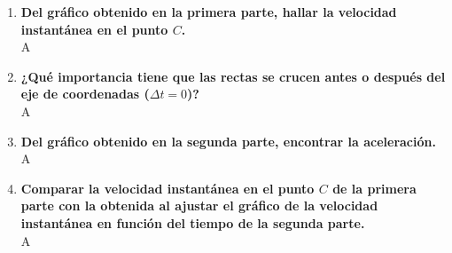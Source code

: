 \documentclass[../main]{subfiles}
\begin{document}
\begin{enumerate}
  \item \textbf{Del gráfico obtenido en la primera parte, hallar la velocidad instantánea en el punto $C$.}\\
    A
  \item \textbf{¿Qué importancia tiene que las rectas se crucen antes o después del eje de
coordenadas ($\Delta t = 0$)?}\\
    A
  \item \textbf{Del gráfico obtenido en la segunda parte, encontrar la aceleración.}\\
    A
  \item \textbf{Comparar la velocidad instantánea en el punto $C$ de la primera parte con la obtenida al ajustar el gráfico de la velocidad instantánea en función del tiempo de la segunda parte.}\\
    A
\end{enumerate}
\end{document}
